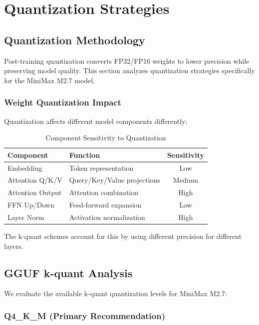 \section{Quantization Strategies}
\label{sec:quantization}

\subsection{Quantization Methodology}

Post-training quantization converts FP32/FP16 weights to lower precision while preserving model quality. This section analyzes quantization strategies specifically for the MiniMax M2.7 model.

\subsubsection{Weight Quantization Impact}

Quantization affects different model components differently:

\begin{table}[h]
\centering
\caption{Component Sensitivity to Quantization}
\label{tab:quantization_sensitivity}
\begin{tabular}{llc}
\toprule
\textbf{Component} & \textbf{Function} & \textbf{Sensitivity} \\
\midrule
Embedding & Token representation & Low \\
Attention Q/K/V & Query/Key/Value projections & Medium \\
Attention Output & Attention combination & High \\
FFN Up/Down & Feed-forward expansion & Low \\
Layer Norm & Activation normalization & High \\
\bottomrule
\end{tabular}
\end{table}

The k-quant schemes account for this by using different precision for different layers.

\subsection{GGUF k-quant Analysis}

We evaluate the available k-quant quantization levels for MiniMax M2.7:

\subsubsection{Q4\_K\_M (Primary Recommendation)}

